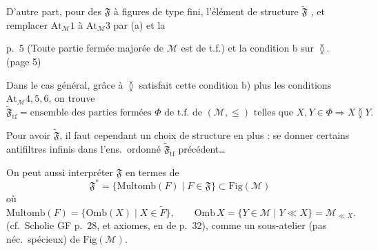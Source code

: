 \documentclass[11pt,a4paper]{article}
\begin{document}

D'autre part, pour des $\mathfrak{F}$ à figures de type fini,  \ill{} l'élément de structure $\widetilde{\mathfrak{F}}$ , et remplacer $\mathrm{At}_{\mathcal{M}}1$ à $\mathrm{At}_{\mathcal{M}}3$ par (a) et la


\struck{\ill{}}  p.\ 5 (Toute partie fermée majorée de $\mathcal{M}$ est de t.f.) et la condition b sur $\between$. (page 5)


Dans le cas général, grâce à  $\between$ satisfait cette condition b) plus les conditions $\mathrm{At}_{\mathcal{M}}4, 5, 6$, on trouve
\[
  \widetilde{\mathfrak{F}}_{\mathrm{tf}} = \text{ensemble des parties fermées } \Phi \text{ de t.f.\ de } (\mathcal{M}, \leq) \text{ telles que } X, Y \in \Phi \Rightarrow X \between Y .
\]

Pour avoir $\widetilde{\mathfrak{F}}$, il faut cependant un choix de structure en plus : se donner certains antifiltres infinis dans l'ens.\ ordonné $\widetilde{\mathfrak{F}}_{\mathrm{tf}}$ précédent…

On peut aussi interpréter $\mathfrak{F}$ en termes de
\[
  \mathfrak{F}^{*} = \lbrace \mathrm{Multomb}(F) \mid F \in \mathfrak{F} \rbrace \subset \mathrm{Fig}(\mathcal{M})
\]
où
\[
  \mathrm{Multomb}(F) = \lbrace \mathrm{Omb}(X) \mid X \in \widetilde{F} \rbrace , \qquad
  \mathrm{Omb}\, X = \lbrace Y \in \mathcal{M} \mid Y \ll X \rbrace = \mathcal{M}_{\ll X} .
\]
(cf.\ Scholie GF p.\ 28, et axiomes, en  de \ill{} p.\ 32), comme un sous-atelier (pas néc.\ spécieux) de $\mathrm{Fig}(\mathcal{M})$.
\end{document}
